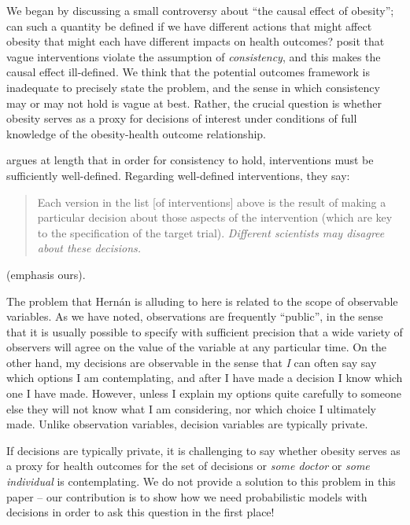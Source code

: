 We began by discussing a small controversy about ``the causal effect of obesity''; can such a quantity be defined if we have different actions that might affect obesity that might each have different impacts on health outcomes? \citet{hernan_does_2008} posit that vague interventions violate the assumption of \emph{consistency}, and this makes the causal effect ill-defined. We think that the potential outcomes framework is inadequate to precisely state the problem, and the sense in which consistency may or may not hold is vague at best. Rather, the crucial question is whether obesity serves as a proxy for decisions of interest under conditions of full knowledge of the obesity-health outcome relationship.

\citet{noauthor_does_2016} argues at length that in order for consistency to hold, interventions must be sufficiently well-defined. Regarding well-defined interventions, they say:
\begin{quote}
Each version in the list [of interventions] above is the result of making a particular decision about those aspects of the intervention (which are key to the specification of the target trial). \emph{Different scientists may disagree about these decisions.}
\end{quote}
(emphasis ours).

The problem that Hern\'an is alluding to here is related to the scope of observable variables. As we have noted, observations are frequently ``public'', in the sense that it is usually possible to specify with sufficient precision that a wide variety of observers will agree on the value of the variable at any particular time. On the other hand, my decisions are observable in the sense that \emph{I} can often say say which options I am contemplating, and after I have made a decision I know which one I have made. However, unless I explain my options quite carefully to someone else they will not know what I am considering, nor which choice I ultimately made. Unlike observation variables, decision variables are typically private.

If decisions are typically private, it is challenging to say whether obesity serves as a proxy for health outcomes for the set of decisions  or \emph{some doctor} or \emph{some individual} is contemplating. We do not provide a solution to this problem in this paper -- our contribution is to show how we need probabilistic models with decisions in order to ask this question in the first place!

